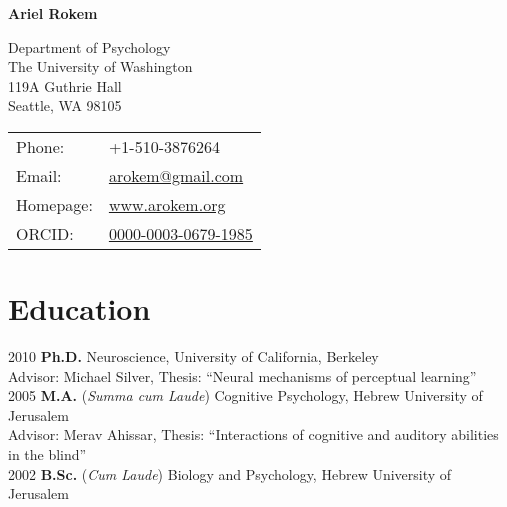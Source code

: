 \documentclass[11pt,fullpage]{article}
\def\name{Ariel Rokem}
\begin{document}
%

\centerline{\Large \bf \name}

\vspace{0.25in}

\begin{minipage}{0.50\linewidth}
  Department of Psychology\\
  The University of Washington\\
  119A Guthrie Hall\\
  Seattle, WA 98105\\
\end{minipage}
\begin{minipage}{0.50\linewidth}
  \begin{tabular}{ll}
    Phone: & +1-510-3876264 \\
    Email: & \href{mailto:arokem@gmail.com}{arokem@gmail.com} \\
    Homepage: & \href{http://arokem.org/}{www.arokem.org} \\
    ORCID: & \href{http://orcid.org/0000-0003-0679-1985}{0000-0003-0679-1985} \\
  \end{tabular}
\end{minipage}

\section*{Education}

	2010  {\bf Ph.D. } Neuroscience, University of California, Berkeley \\
  \hspace{\parindent} Advisor: Michael Silver, Thesis: ``Neural mechanisms of perceptual learning''\\
	2005  {\bf M.A.} (\emph{Summa cum Laude}) Cognitive Psychology, Hebrew University of Jerusalem \\
  \hspace{\parindent} Advisor: Merav Ahissar, Thesis: ``Interactions of cognitive and auditory abilities in the blind'' \\
	2002  {\bf B.Sc.} (\emph{Cum Laude}) Biology and Psychology, Hebrew University of Jerusalem \\
\end{document}
